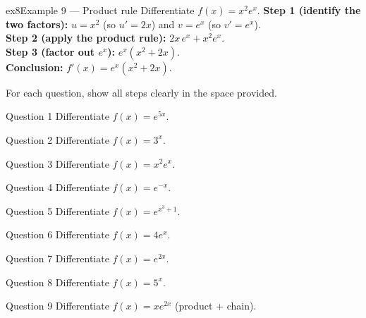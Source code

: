 \documentclass[11pt]{article}
\begin{document}
\begin{example}{ex8}{Example 9 --- Product rule}
Differentiate $f(x)=x^2 e^x$.\soln
\textbf{Step 1 (identify the two factors):} $u=x^2$ (so $u'=2x$) and $v=e^x$ (so $v'=e^x$).\\[3pt]
\textbf{Step 2 (apply the product rule):} $2x\,e^x+x^2e^x$.\\[3pt]
\textbf{Step 3 (factor out $e^x$):} $e^x(x^2+2x)$.\\[3pt]
\textbf{Conclusion:} $f'(x)=e^x(x^2+2x)$.
\end{example}

\clearpage
{}
For each question, show all steps clearly in the space provided.

\begin{qbox}{Question 1}
Differentiate $f(x)=e^{5x}$.\workspace{2.4cm}
\end{qbox}

\begin{qbox}{Question 2}
Differentiate $f(x)=3^x$.\workspace{2.4cm}
\end{qbox}

\begin{qbox}{Question 3}
Differentiate $f(x)=x^2 e^x$.\workspace{2.4cm}
\end{qbox}

\begin{qbox}{Question 4}
Differentiate $f(x)=e^{-x}$.\workspace{2.4cm}
\end{qbox}

\begin{qbox}{Question 5}
Differentiate $f(x)=e^{x^3+1}$.\workspace{2.4cm}
\end{qbox}

\begin{qbox}{Question 6}
Differentiate $f(x)=4e^x$.\workspace{2.4cm}
\end{qbox}

\begin{qbox}{Question 7}
Differentiate $f(x)=e^{2x}$.\workspace{2.4cm}
\end{qbox}

\begin{qbox}{Question 8}
Differentiate $f(x)=5^x$.\workspace{2.4cm}
\end{qbox}

\begin{qbox}{Question 9}
Differentiate $f(x)=x e^{2x}$ (product + chain).\workspace{2.4cm}
\end{qbox}
\end{document}
